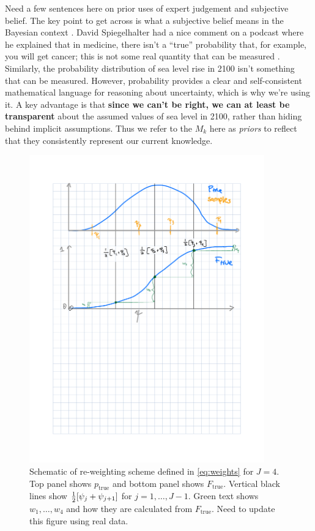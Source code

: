 \documentclass[12pt]{article}
\begin{document}
Need a few sentences here on prior uses of expert judgement and subjective belief.
The key point to get across is what a subjective belief means in the Bayesian context \citep{savage:1954,gelman_philosophy:2013,gelman_subjectiveobjective:2017}.
David Spiegelhalter had a nice comment on a podcast where he explained that in medicine, there isn't a ``true'' probability that, for example, you will get cancer; this is not some real quantity that can be measured \citep[hence the famous ``probability isn't real'' admonisment of][]{definetti_probability:1972}.
Similarly, the probability distribution of sea level rise in 2100 isn't something that can be measured.
However, probability provides a clear and self-consistent mathematical language for reasoning about uncertainty, which is why we're using it.
A key advantage is that \textbf{since we can't be right, we can at least be transparent} about the assumed values of sea level in 2100, rather than hiding behind implicit assumptions.
Thus we refer to the $M_k$ here as \emph{priors} to reflect that they consistently represent our current knowledge.

\begin{figure}
    \centering
    \includegraphics[width=4in]{../img/weighting.pdf}
    \caption{
        Schematic of re-weighting scheme defined in \cref{eq:weights} for $J=4$.
        Top panel shows $p_\mathrm{true}$ and bottom panel shows $F_\mathrm{true}$.
        Vertical black lines show $\frac{1}{2}\qty[\psi_j + \psi_{j+1}]$ for $j=1, \ldots, J-1$.
        Green text shows $w_1, \ldots, w_4$ and how they are calculated from $F_\mathrm{true}$.
        Need to update this figure using real data.
    }\label{fig:weighting}
\end{figure}
\end{document}
